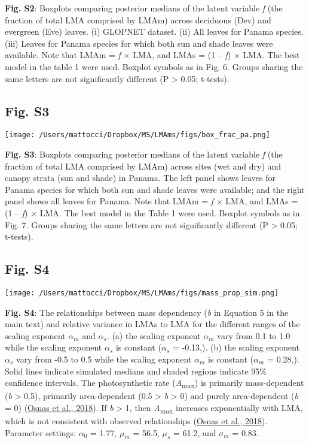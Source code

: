 \documentclass[
  12pt,
  letterpaper,
  DIV=11,
  numbers=noendperiod]{scrartcl}
\begin{document}
\textbf{Fig. S2}: Boxplots comparing posterior medians of the latent
variable \emph{f} (the fraction of total LMA comprised by LMAm) across
deciduous (Dev) and evergreen (Eve) leaves. (i) GLOPNET dataset. (ii)
All leaves for Panama species. (iii) Leaves for Panama species for which
both sun and shade leaves were available. Note that LMAm = \emph{f}
\(\times\) LMA, and LMAs = (1 -- \emph{f}) \(\times\) LMA. The best
model in the table 1 were used. Boxplot symbols as in Fig. 6. Groups
sharing the same letters are not significantly different (P
\textgreater{} 0.05; t-tests).

\newpage

\hypertarget{fig.-s3}{%
\subsection{Fig. S3}\label{fig.-s3}}

\texttt{[image: /Users/mattocci/Dropbox/MS/LMAms/figs/box\_frac\_pa.png]}

\textbf{Fig. S3}: Boxplots comparing posterior medians of the latent
variable \emph{f} (the fraction of total LMA comprised by LMAm) across
sites (wet and dry) and canopy strata (sun and shade) in Panama. The
left panel shows leaves for Panama species for which both sun and shade
leaves were available; and the right panel shows all leaves for Panama.
Note that LMAm = \emph{f} \(\times\) LMA, and LMAs = (1 -- \emph{f})
\(\times\) LMA. The best model in the Table 1 were used. Boxplot symbols
as in Fig. 7. Groups sharing the same letters are not significantly
different (P \textgreater{} 0.05; t-tests).

\newpage

\hypertarget{fig.-s4}{%
\subsection{Fig. S4}\label{fig.-s4}}

\texttt{[image: /Users/mattocci/Dropbox/MS/LMAms/figs/mass\_prop\_sim.png]}

\textbf{Fig. S4}: The relationships between mass dependency (\emph{b} in
Equation 5 in the main text) and relative variance in LMAs to LMA for
the different ranges of the scaling exponent \(\alpha_m\) and
\(\alpha_s\). (a) the scaling exponent \(\alpha_m\) vary from 0.1 to 1.0
while the scaling exponent \(\alpha_s\) is constant (\(\alpha_s\) =
-0.13,). (b) the scaling exponent \(\alpha_s\) vary from -0.5 to 0.5
while the scaling exponent \(\alpha_m\) is constant (\(\alpha_m\) =
0.28,). Solid lines indicate simulated medians and shaded regions
indicate 95\% confidence intervals. The photosynthetic rate
(\emph{A}\textsubscript{max}) is primarily mass-dependent (\emph{b}
\textgreater{} 0.5), primarily area-dependent (0.5 \textgreater{}
\emph{b} \textgreater{} 0) and purely area-dependent (\emph{b} = 0)
(\protect\hyperlink{ref-Osnas2018}{Osnas et al., 2018}). If \emph{b}
\textgreater{} 1, then \emph{A}\textsubscript{max} increases
exponentially with LMA, which is not consistent with observed
relationships (\protect\hyperlink{ref-Osnas2018}{Osnas et al., 2018}).
Parameter settings: \(\alpha_0\) = 1.77, \(\mu_m\) = 56.5, \(\mu_s\) =
61.2, and \(\sigma_m\) = 0.83.
\end{document}
